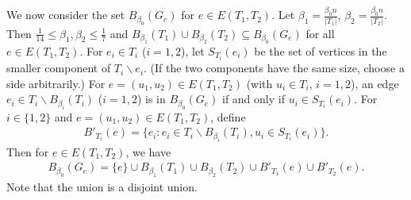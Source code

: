 We now consider the set $B_{\beta_0}(G_e)$ for $e\in E(T_1,T_2)$.
Let $\beta_1 = \frac{\beta_0 n}{|T_1|}$, $\beta_2 = \frac{\beta_0 n}{|T_2|}$.
Then $\frac 1{14}\le \beta_1,\beta_2\le \frac 17$ and $B_{\beta_1}(T_1) \cup B_{\beta_2}(T_2) \subseteq B_{\beta_0}(G_e)$ for all $e\in E(T_1,T_2)$.
For $e_i\in T_i$ ($i=1,2$), let $S_{T_i}(e_i)$ be the set of vertices in the smaller component of $T_i\backslash e_i$. (If the two components have the same size, choose a side arbitrarily.)
For $e=(u_1,u_2)\in E(T_1,T_2)$ (with $u_i\in T_i$, $i=1,2$), an edge $e_i\in T_i\backslash B_{\beta_i}(T_i)$ ($i=1,2$) is in $B_{\beta_0}(G_e)$ if and only if $u_i\in S_{T_i}(e_i)$.
For $i\in \{1,2\}$ and $e=(u_1,u_2)\in E(T_1,T_2)$, define
\begin{align*}
  B'_{T_i}(e) = \{e_i : e_i\in T_i\backslash B_{\beta_i}(T_i), u_i\in S_{T_i}(e_i)\}.
\end{align*}
Then for $e\in E(T_1,T_2)$, we have
\begin{align} \label{eqn:sec:conn:phase-2:step-c:new-balanced}
  B_{\beta_0}(G_e) = \{e\} \cup B_{\beta_1}(T_1) \cup B_{\beta_2}(T_2) \cup B'_{T_1}(e) \cup B'_{T_2}(e).
\end{align}
Note that the union is a disjoint union.

